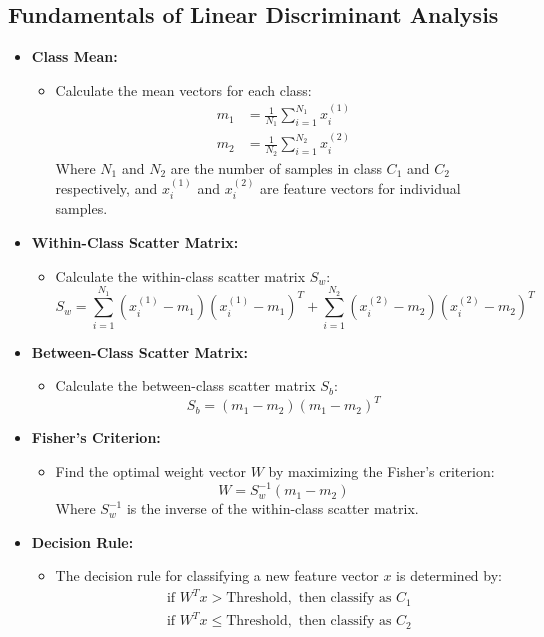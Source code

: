 \subsection{Fundamentals of Linear Discriminant Analysis}

\begin{itemize}[leftmargin=*]
    \item \textbf{Class Mean:}
    \begin{itemize}
        \item Calculate the mean vectors for each class:
        \begin{align*}
            m_1 &= \frac{1}{N_1} \sum_{i=1}^{N_1} x_i^{(1)} \\
            m_2 &= \frac{1}{N_2} \sum_{i=1}^{N_2} x_i^{(2)}
        \end{align*}
        Where \(N_1\) and \(N_2\) are the number of samples in class \(C_1\) and \(C_2\) respectively, and \(x_i^{(1)}\) and \(x_i^{(2)}\) are feature vectors for individual samples.
    \end{itemize}
    
    \item \textbf{Within-Class Scatter Matrix:}
    \begin{itemize}
        \item Calculate the within-class scatter matrix \(S_w\):
        \[ S_w = \sum_{i=1}^{N_1} (x_i^{(1)} - m_1)(x_i^{(1)} - m_1)^T + \sum_{i=1}^{N_2} (x_i^{(2)} - m_2)(x_i^{(2)} - m_2)^T \]
    \end{itemize}
    
    \item \textbf{Between-Class Scatter Matrix:}
    \begin{itemize}
        \item Calculate the between-class scatter matrix \(S_b\):
        \[ S_b = (m_1 - m_2)(m_1 - m_2)^T \]
    \end{itemize}
    
    \item \textbf{Fisher's Criterion:}
    \begin{itemize}
        \item Find the optimal weight vector \(W\) by maximizing the Fisher's criterion:
        \[ W = S_w^{-1} (m_1 - m_2) \]
        Where \(S_w^{-1}\) is the inverse of the within-class scatter matrix.
    \end{itemize}
    
    \item \textbf{Decision Rule:}
    \begin{itemize}
        \item The decision rule for classifying a new feature vector \(x\) is determined by:
        \begin{align*}
            &\text{if } W^T x > \text{Threshold}, \text{ then classify as } C_1 \\
            &\text{if } W^T x \leq \text{Threshold}, \text{ then classify as } C_2
        \end{align*}
    \end{itemize}
\end{itemize}
\clearpage
